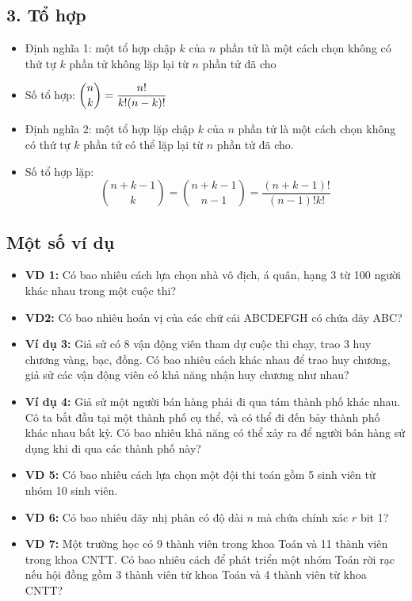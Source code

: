 \documentclass[12pt,a4paper]{article}
\begin{document}
\subsection*{3. Tổ hợp}
\begin{itemize}
    \item Định nghĩa 1: một tổ hợp chập $k$ của $n$ phần tử là một cách chọn không có thứ tự $k$ phần tử không lặp lại từ $n$ phần tử đã cho
    \item Số tổ hợp: $\dbinom{n}{k} = \dfrac{n!}{k!(n-k)!}$
    \item Định nghĩa 2: một tổ hợp lặp chập $k$ của $n$ phần tử là một cách chọn không có thứ tự $k$ phần tử có thể lặp lại từ $n$ phần tử đã cho.
    \item Số tổ hợp lặp:
    $$\binom{n+k-1}{k} = \binom{n+k-1}{n-1} = \frac{(n+k-1)!}{(n-1)!k!}$$
\end{itemize}

\subsection*{Một số ví dụ}
\begin{itemize}
    \item \textbf{VD 1:} Có bao nhiêu cách lựa chọn nhà vô địch, á quân, hạng 3 từ 100 người khác nhau trong một cuộc thi?
    \item \textbf{VD2:} Có bao nhiêu hoán vị của các chữ cái ABCDEFGH có chứa dãy ABC?
    \item \textbf{Ví dụ 3:} Giả sử có 8 vận động viên tham dự cuộc thi chạy, trao 3 huy chương vàng, bạc, đồng. Có bao nhiêu cách khác nhau để trao huy chương, giả sử các vận động viên có khả năng nhận huy chương như nhau?
    \item \textbf{Ví dụ 4:} Giả sử một người bán hàng phải đi qua tám thành phố khác nhau. Cô ta bắt đầu tại một thành phố cụ thể, và có thể đi đến bảy thành phố khác nhau bất kỳ. Có bao nhiêu khả năng có thể xảy ra để người bán hàng sử dụng khi đi qua các thành phố này?
    \item \textbf{VD 5:} Có bao nhiêu cách lựa chọn một đội thi toán gồm 5 sinh viên từ nhóm 10 sinh viên.
    \item \textbf{VD 6:} Có bao nhiêu dãy nhị phân có độ dài $n$ mà chứa chính xác $r$ bit 1?
    \item \textbf{VD 7:} Một trường học có 9 thành viên trong khoa Toán và 11 thành viên trong khoa CNTT. Có bao nhiêu cách để phát triển một nhóm Toán rời rạc nếu hội đồng gồm 3 thành viên từ khoa Toán và 4 thành viên từ khoa CNTT?
\end{itemize}
\end{document}
